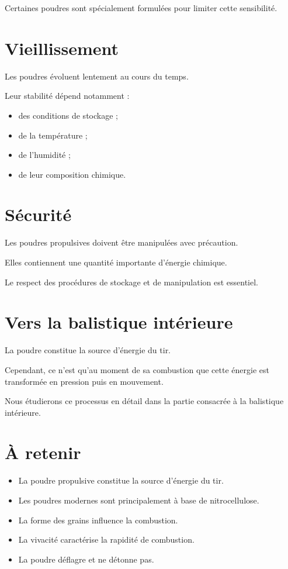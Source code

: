 Certaines poudres sont spécialement formulées pour limiter cette sensibilité.

\section{Vieillissement}

Les poudres évoluent lentement au cours du temps.

Leur stabilité dépend notamment :

\begin{itemize}
    \item des conditions de stockage ;
    \item de la température ;
    \item de l'humidité ;
    \item de leur composition chimique.
\end{itemize}

\section{Sécurité}

Les poudres propulsives doivent être manipulées avec précaution.

Elles contiennent une quantité importante d'énergie chimique.

Le respect des procédures de stockage et de manipulation est essentiel.

\section{Vers la balistique intérieure}

La poudre constitue la source d'énergie du tir.

Cependant, ce n'est qu'au moment de sa combustion que cette énergie est
transformée en pression puis en mouvement.

Nous étudierons ce processus en détail dans la partie consacrée à la
balistique intérieure.

\section{À retenir}

\begin{aretenir}

\begin{itemize}
    \item La poudre propulsive constitue la source d'énergie du tir.
    \item Les poudres modernes sont principalement à base de
          nitrocellulose.
    \item La forme des grains influence la combustion.
    \item La vivacité caractérise la rapidité de combustion.
    \item La poudre déflagre et ne détonne pas.
\end{itemize}

\end{aretenir}
